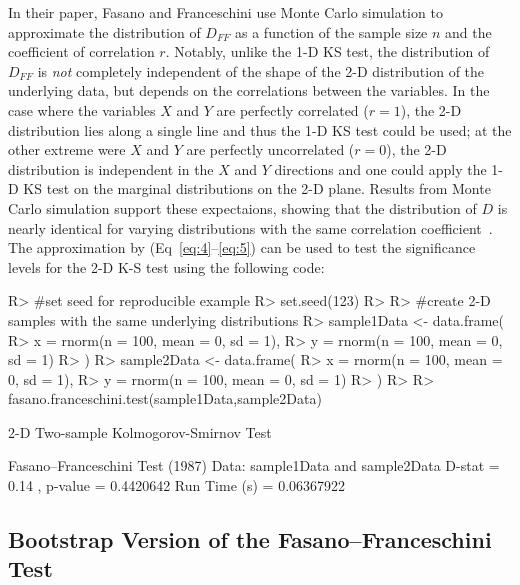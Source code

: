 \documentclass[codesnippet]{jss}
\begin{document}
In their paper, Fasano and Franceschini use Monte Carlo simulation to
approximate the distribution of $D_{FF}$ as a function of the sample
size $n$ and the coefficient of correlation $r$. Notably, unlike the 1-D KS
test, the distribution of
$D_{FF}$ is \textit{not} completely independent of the shape of the 2-D distribution of the
underlying data, but depends on the correlations between the variables.
In the case where the variables $X$ and $Y$  are perfectly
correlated ($r = 1$), the 2-D distribution lies along a single line and thus
the 1-D KS test could be used; at the other extreme were $X$ and $Y$  are perfectly
uncorrelated ($r = 0$), the 2-D distribution is independent in the $X$
and $Y$ directions and one could apply the 1-D KS test on the marginal
distributions on the 2-D plane.
%
Results from Monte Carlo simulation support these expectaions, showing
that the distribution of $D$ is nearly identical for varying
distributions with the same correlation coefficient~\citep{Fasano1987}.
The approximation
by  \cite{numericalRecipes} (Eq~\ref{eq:4}--\ref{eq:5})
can be used to test the significance levels for the 2-D K-S test using
the following code:
%
\begin{CodeChunk}
\begin{CodeInput}
R> #set seed for reproducible example
R> set.seed(123)
R>
R> #create 2-D samples with the same underlying distributions
R> sample1Data <- data.frame(
R>  x = rnorm(n = 100, mean = 0, sd = 1),
R>  y = rnorm(n = 100, mean = 0, sd = 1)
R> )
R> sample2Data <- data.frame(
R>  x = rnorm(n = 100, mean = 0, sd = 1),
R>  y = rnorm(n = 100, mean = 0, sd = 1)
R> )
R>
R> fasano.franceschini.test(sample1Data,sample2Data)
\end{CodeInput}
\begin{CodeOutput}
      2-D Two-sample Kolmogorov-Smirnov Test

 Fasano--Franceschini Test (1987)
 Data:  sample1Data and sample2Data
 D-stat =  0.14 , p-value =  0.4420642
 Run Time (s) =  0.06367922
\end{CodeOutput}
\end{CodeChunk}

\subsection{Bootstrap Version of the Fasano--Franceschini Test}
\end{document}
